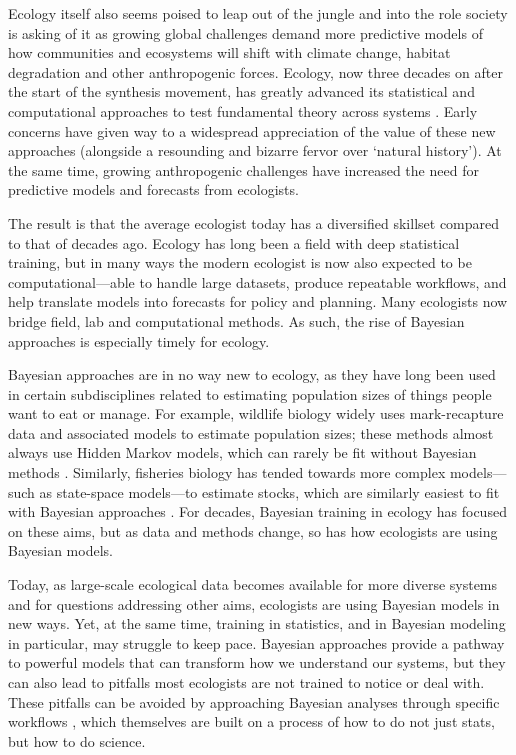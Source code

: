 \documentclass[11pt]{article}
\begin{document}
Ecology itself also seems poised to leap out of the jungle and into the role society is asking of it as growing global challenges demand more predictive models of how communities and ecosystems will shift with climate change, habitat degradation and other anthropogenic forces. Ecology, now three decades on after the start of the synthesis movement, has greatly advanced its statistical and computational approaches to test fundamental theory across systems \citep{Hampton2013}. Early concerns have given way to a widespread appreciation of the value of these new approaches (alongside a resounding and bizarre fervor over `natural history'). At the same time, growing anthropogenic challenges have increased the need for predictive models and forecasts from ecologists. 

The result is that the average ecologist today has a diversified skillset compared to that of decades ago. Ecology has long been a field with deep statistical training, but in many ways the modern ecologist is now also expected to be computational---able to handle large datasets, produce repeatable workflows, and help translate models into forecasts for policy and planning. Many ecologists now bridge field, lab and computational methods. As such, the rise of Bayesian approaches is especially timely for ecology. %

Bayesian approaches are in no way new to ecology, as they have long been used in certain subdisciplines related to estimating population sizes of things people want to eat or manage. For example, wildlife biology widely uses mark-recapture data and associated models to estimate population sizes; these methods almost always use Hidden Markov models, which can rarely be fit without Bayesian methods \citep{muthuku2008,zheng2007}. Similarly, fisheries biology has tended towards more complex models---such as state-space models---to estimate stocks, which are similarly easiest to fit with Bayesian approaches \citep{trijoulet2018,millar2000}. For decades, Bayesian training in ecology has focused on these aims, but as data and methods change, so has how ecologists are using Bayesian models. 

Today, as large-scale ecological data becomes available for more diverse systems and for questions addressing other aims, ecologists are using Bayesian models in new ways. Yet, at the same time, training in statistics, and in Bayesian modeling in particular, may struggle to keep pace. Bayesian approaches provide a pathway to powerful models that can transform how we understand our systems, but they can also lead to pitfalls most ecologists are not trained to notice or deal with. These pitfalls can be avoided by approaching Bayesian analyses through specific workflows \citep{betanworkflow,vandeschoot2021}, which themselves are built on a process of how to do not just stats, but how to do science. 
\end{document}
